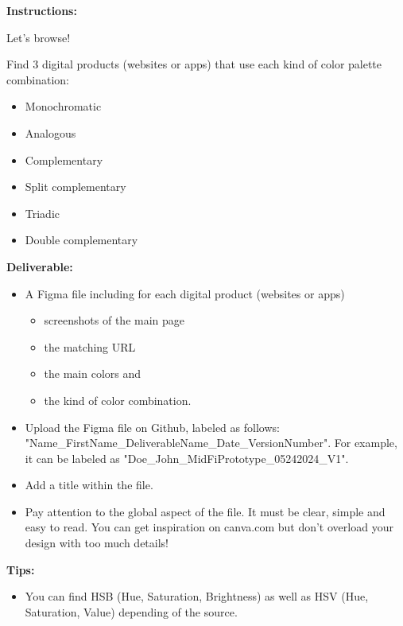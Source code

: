 \makeheaderfiles

\textbf{Instructions:}

Let's browse!

Find 3 digital products (websites or apps) that use each kind of color palette combination:

\begin{itemize}
\item Monochromatic
\item Analogous
\item Complementary
\item Split complementary
\item Triadic
\item Double complementary
\end{itemize}

\textbf{Deliverable:}

\begin{itemize}
\item A Figma file including for each digital product (websites or apps)
\begin{itemize}
\item screenshots of the main page
\item the matching URL
\item the main colors and
\item the kind of color combination.
\end{itemize}
\item Upload the Figma file on Github, labeled as follows: "Name\_FirstName\_DeliverableName\_Date\_VersionNumber". For example, it can be labeled as "Doe\_John\_MidFiPrototype\_05242024\_V1".
\item Add a title within the file.
\item Pay attention to the global aspect of the file. It must be clear, simple and easy to read. You can get inspiration on canva.com but don't overload your design with too much details!
\end{itemize}

\textbf{Tips:}

\begin{itemize}
\item You can find HSB (Hue, Saturation, Brightness) as well as HSV (Hue, Saturation, Value) depending of the source.
\end{itemize}

